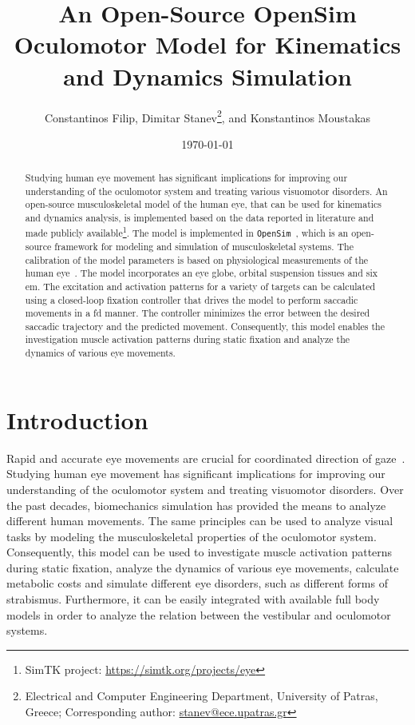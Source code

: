 \documentclass[11pt,a4paper,draft=false]{report}
\title{An Open-Source OpenSim Oculomotor Model for Kinematics and Dynamics
  Simulation}
\author{Constantinos Filip, Dimitar Stanev\footnote{Electrical and Computer
    Engineering Department, University of Patras, Greece; Corresponding
    author: \url{stanev@ece.upatras.gr}}, and Konstantinos Moustakas}
\date{\today}
\begin{document}

\maketitle

\begin{abstract}
  Studying human eye movement has significant implications for improving our
  understanding of the oculomotor system and treating various visuomotor
  disorders. An open-source musculoskeletal model of the human eye, that can be
  used for kinematics and dynamics analysis, is implemented based on the data
  reported in literature and made publicly available\footnote{SimTK project:
    \url{https://simtk.org/projects/eye}}. The model is implemented in
  \texttt{OpenSim}~\cite{Delp2007}, which is an open-source framework for
  modeling and simulation of musculoskeletal systems. The calibration of the
  model parameters is based on physiological measurements of the human
  eye~\cite{Iskander2018}. The model incorporates an eye globe, orbital
  suspension tissues and six \gls{em}. The excitation and activation patterns
  for a variety of targets can be calculated using a closed-loop fixation
  controller that drives the model to perform saccadic movements in a \gls{fd}
  manner. The controller minimizes the error between the desired saccadic
  trajectory and the predicted movement. Consequently, this model enables the
  investigation muscle activation patterns during static fixation and analyze
  the dynamics of various eye movements.
\end{abstract}

\section*{Introduction}\label{sec:introduction}

Rapid and accurate eye movements are crucial for coordinated direction of
gaze~\cite{Lee2006}. Studying human eye movement has significant implications
for improving our understanding of the oculomotor system and treating visuomotor
disorders. Over the past decades, biomechanics simulation has provided the means
to analyze different human movements. The same principles can be used to analyze
visual tasks by modeling the musculoskeletal properties of the oculomotor
system. Consequently, this model can be used to investigate muscle activation
patterns during static fixation, analyze the dynamics of various eye movements,
calculate metabolic costs and simulate different eye disorders, such as
different forms of strabismus. Furthermore, it can be easily integrated with
available full body models in order to analyze the relation between the
vestibular and oculomotor systems.
\end{document}
